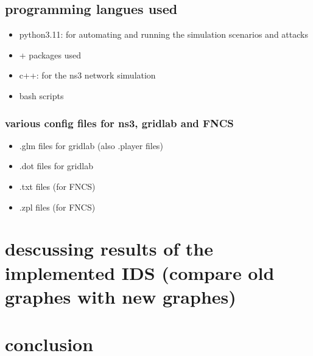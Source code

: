 \subsection{programming langues used}
\begin{itemize}
	\item python3.11: for automating and running the simulation scenarios and attacks
	\item + packages used
	\item c++: for the ns3 network simulation 
	\item bash scripts
\end{itemize}


\subsubsection{various config files for ns3, gridlab and FNCS}
\begin{itemize}
	\item .glm files for gridlab (also .player files)
	\item .dot files for gridlab
	\item .txt files (for FNCS) 
	\item .zpl files (for FNCS) 
\end{itemize}



\section{descussing results of the implemented IDS (compare old graphes with new graphes)}





\section{conclusion}
